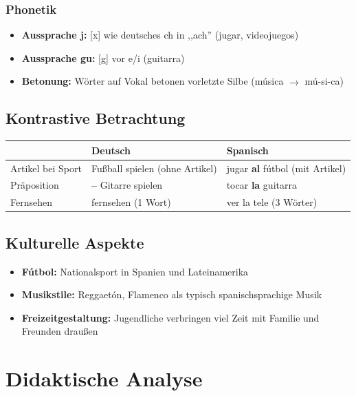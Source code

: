 \documentclass[11pt,a4paper]{article}
\begin{document}
\subsubsection{Phonetik}
\begin{itemize}
    \item \textbf{Aussprache j:} [x] wie deutsches ch in ,,ach'' (jugar, videojuegos)
    \item \textbf{Aussprache gu:} [g] vor e/i (guitarra)
    \item \textbf{Betonung:} Wörter auf Vokal betonen vorletzte Silbe (música $\rightarrow$ mú-si-ca)
\end{itemize}

\subsection{Kontrastive Betrachtung}

\begin{tabular}{|l|p{5cm}|p{5cm}|}
\hline
& \textbf{Deutsch} & \textbf{Spanisch} \\
\hline
Artikel bei Sport & Fußball spielen (ohne Artikel) & jugar \textbf{al} fútbol (mit Artikel) \\
\hline
Präposition & \textbf{--} Gitarre spielen & tocar \textbf{la} guitarra \\
\hline
Fernsehen & fernsehen (1 Wort) & ver la tele (3 Wörter) \\
\hline
\end{tabular}

\subsection{Kulturelle Aspekte}
\begin{itemize}
    \item \textbf{Fútbol:} Nationalsport in Spanien und Lateinamerika
    \item \textbf{Musikstile:} Reggaetón, Flamenco als typisch spanischsprachige Musik
    \item \textbf{Freizeitgestaltung:} Jugendliche verbringen viel Zeit mit Familie und Freunden draußen
\end{itemize}

\section{Didaktische Analyse}
\end{document}
